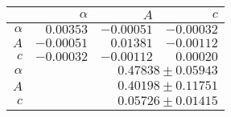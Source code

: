 \begin{table}
\caption{}
\centering
 \begin{tabular}{|r|r|r|r|}
 \hline 
\cellcolor{tabcolor}&\cellcolor{tabcolor}$\alpha$&\cellcolor{tabcolor}$A$&\cellcolor{tabcolor}$c$\\ \hline 
 \cellcolor{tabcolor}$\alpha$&$0.00353$ &$-0.00051$ &$-0.00032$ \\ 
\cellcolor{tabcolor}$A$&$-0.00051$ &$0.01381$ &$-0.00112$ \\ 
\cellcolor{tabcolor}$c$&$-0.00032$ &$-0.00112$ &$0.00020$ \\ \hline \hline
\cellcolor{tabcolor}$\alpha$&\multicolumn{3}{r|}{$0.47838 \pm 0.05943$ }\\ 
\cellcolor{tabcolor}$A$&\multicolumn{3}{r|}{$0.40198 \pm 0.11751$ }\\ 
\cellcolor{tabcolor}$c$&\multicolumn{3}{r|}{$0.05726 \pm 0.01415$ }\\ 
\hline\end{tabular}
\end{table}
